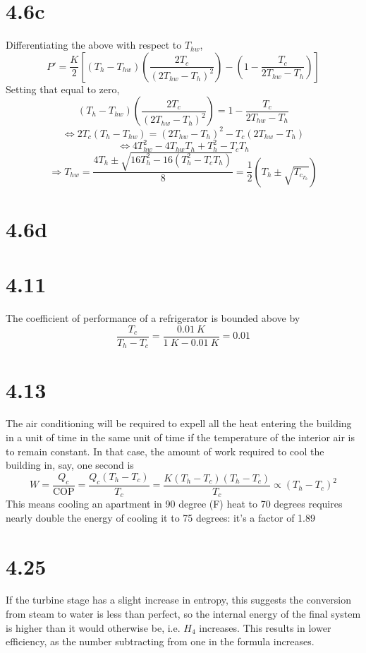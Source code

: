 \message{ !name(hw5.tex)}\documentclass{article}
\begin{document}
\section*{4.6c}
Differentiating the above with respect to $T_{hw}$,
\[P'=\frac{K}{2}\left[ (T_{h}-T_{hw})\left(  \frac{2T_{c}}{(2T_{hw}-T_{h})^{2}}\right)-\left( 1-\frac{T_{c}}{2T_{hw}-T_{h}} \right)\right]\]
Setting that equal to zero,
\[(T_{h}-T_{hw})\left( \frac{2T_{c}}{(2T_{hw}-T_{h})^{2}} \right)=1-\frac{T_{c}}{2T_{hw}-T_{h}}\]\[\Leftrightarrow 2T_{c}(T_{h}-T_{hw})=(2T_{hw}-T_{h})^{2}-T_{c}(2T_{hw}-T_{h})\]
\[\Leftrightarrow 4T_{hw}^{2}-4T_{hw}T_{h}+T_{h}^{2}-T_{c}T_{h}\]
\[\Rightarrow T_{hw}=\frac{4T_{h}\pm\sqrt{16T_{h}^{2}-16(T_{h}^{2}-T_{c}T_{h})}}{8}=\frac{1}{2}\left( T_{h}\pm\sqrt{T_{c}_T_{h}} \right)\]

\section*{4.6d}

\section*{4.11}
The coefficient of performance of a refrigerator is bounded above by
\[\frac{T_{c}}{T_{h}-T_{c}}=\frac{\SI{0.01}{K}}{\SI{1}{K}-\SI{0.01}{K}}=0.01\]

\section*{4.13}
The air conditioning will be required to expell all the heat entering the building in a unit of time in the same unit of time if the temperature of the interior air is to remain constant. In that case, the amount of work required to cool the building in, say, one second is
\[W=\frac{Q_{c}}{\textrm{COP}}=\frac{Q_{c}(T_{h}-T_{c})}{T_{c}}=\frac{K(T_{h}-T_{c})(T_{h}-T_{c})}{T_{c}}\propto (T_{h}-T_{c})^{2}\]
This means cooling an apartment in 90 degree (F) heat to 70 degrees requires nearly double the energy of cooling it to 75 degrees: it's a factor of 1.89

\section*{4.25}
If the turbine stage has a slight increase in entropy, this suggests the conversion from steam to water is less than perfect, so the internal energy of the final system is higher than it would otherwise be, i.e. $H_{4}$ increases. This results in lower efficiency, as the number subtracting from one in the formula increases.
\end{document}
